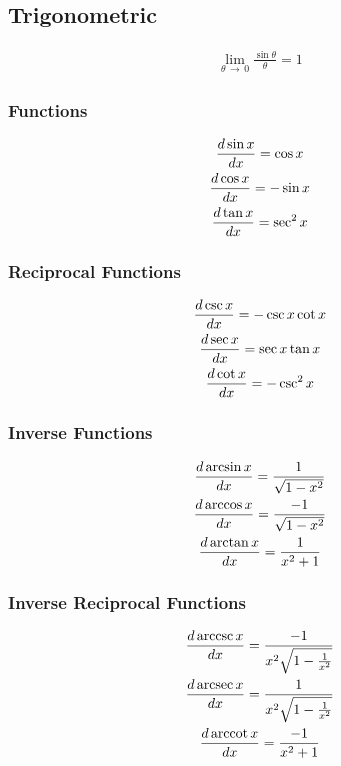 \documentclass[12pt]{article}
\numberwithin{equation}{subsubsection}
\begin{document}
		\subsection{Trigonometric}
			\begin{gather}
				\lim_{\theta \,\to\, 0} \frac{\sin \theta}{\theta} =
				1
			\end{gather}
			\subsubsection{Functions}
				\begin{gather}
					\frac{d \sin x}{d x} = \cos x \\
					\frac{d \cos x}{d x} = -\sin x \\
					\frac{d \tan x}{d x} = \sec^2 x
				\end{gather}
			\subsubsection{Reciprocal Functions}
				\begin{gather}
					\frac{d \csc x}{d x} = -\csc x \cot x \\
					\frac{d \sec x}{d x} = \sec x \tan x \\
					\frac{d \cot x}{d x} = -\csc^2 x
				\end{gather}
			\subsubsection{Inverse Functions}
				\begin{gather}
					\frac{d \arcsin x}{d x} = \frac{1}{\sqrt{1 -
					x^2}} \\
					\frac{d \arccos x}{d x} = \frac{-1}{\sqrt{1 -
					x^2}}  \\
					\frac{d \arctan x}{d x} = \frac{1}{x^2 + 1}
				\end{gather}
			\subsubsection{Inverse Reciprocal Functions}
				\begin{gather}
					\frac{d \,\text{arccsc}\, x}{d x} = \frac{-1}{x^2\sqrt{1
					- \frac{1}{x^2}}} \\
					\frac{d \,\text{arcsec}\, x}{d x} = \frac{1}{x^2\sqrt{1
					- \frac{1}{x^2}}} \\
					\frac{d \,\text{arccot}\, x}{d x} = \frac{-1}{x^2 + 1}
				\end{gather}
\end{document}
